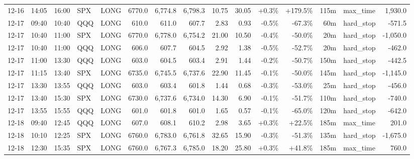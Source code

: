 \documentclass[11pt,a4paper,twoside]{article}
\begin{document}
\begin{landscape}
\begin{center}
\begin{longtable}{>{\color{txtmain}}l l l l l r r r r r r r r >{\color{txtmain}}l r}
12-16 & 14:05 & 16:00 & SPX & LONG & 6770.0 & 6,774.8 & 6,798.3 & 10.75 & 30.05 & \textcolor{wingreen}{+0.3\%} & \textcolor{wingreen}{+179.5\%} & 115m & max\_time & \textcolor{wingreen}{1,930.0} \\
12-17 & 09:40 & 10:40 & QQQ & LONG & 610.0 & 611.0 & 607.7 & 2.83 & 0.93 & \textcolor{lossred}{-0.5\%} & \textcolor{lossred}{-67.3\%} & 60m & hard\_stop & \textcolor{lossred}{-571.5} \\
12-17 & 10:40 & 11:00 & SPX & LONG & 6770.0 & 6,778.0 & 6,754.2 & 21.00 & 10.50 & \textcolor{lossred}{-0.4\%} & \textcolor{lossred}{-50.0\%} & 20m & hard\_stop & \textcolor{lossred}{-1,050.0} \\
12-17 & 10:40 & 11:00 & QQQ & LONG & 606.0 & 607.7 & 604.5 & 2.92 & 1.38 & \textcolor{lossred}{-0.5\%} & \textcolor{lossred}{-52.7\%} & 20m & hard\_stop & \textcolor{lossred}{-462.0} \\
12-17 & 11:00 & 13:30 & QQQ & LONG & 603.0 & 604.5 & 603.4 & 2.91 & 1.44 & \textcolor{lossred}{-0.2\%} & \textcolor{lossred}{-50.7\%} & 150m & hard\_stop & \textcolor{lossred}{-442.5} \\
12-17 & 11:15 & 13:40 & SPX & LONG & 6735.0 & 6,745.5 & 6,737.6 & 22.90 & 11.45 & \textcolor{lossred}{-0.1\%} & \textcolor{lossred}{-50.0\%} & 145m & hard\_stop & \textcolor{lossred}{-1,145.0} \\
12-17 & 13:30 & 13:55 & QQQ & LONG & 603.0 & 603.4 & 601.8 & 1.44 & 0.68 & \textcolor{lossred}{-0.3\%} & \textcolor{lossred}{-53.0\%} & 25m & hard\_stop & \textcolor{lossred}{-456.0} \\
12-17 & 13:40 & 15:30 & SPX & LONG & 6730.0 & 6,737.6 & 6,734.0 & 14.30 & 6.90 & \textcolor{lossred}{-0.1\%} & \textcolor{lossred}{-51.7\%} & 110m & hard\_stop & \textcolor{lossred}{-740.0} \\
12-17 & 13:55 & 15:55 & QQQ & LONG & 601.0 & 601.8 & 601.0 & 1.65 & 0.57 & \textcolor{lossred}{-0.1\%} & \textcolor{lossred}{-65.0\%} & 120m & hard\_stop & \textcolor{lossred}{-642.0} \\
12-18 & 09:40 & 12:45 & QQQ & LONG & 607.0 & 608.1 & 610.2 & 2.98 & 3.65 & \textcolor{wingreen}{+0.3\%} & \textcolor{wingreen}{+22.5\%} & 185m & max\_time & \textcolor{wingreen}{201.0} \\
12-18 & 10:10 & 12:25 & SPX & LONG & 6760.0 & 6,783.0 & 6,761.8 & 32.65 & 15.90 & \textcolor{lossred}{-0.3\%} & \textcolor{lossred}{-51.3\%} & 135m & hard\_stop & \textcolor{lossred}{-1,675.0} \\
12-18 & 12:30 & 15:35 & SPX & LONG & 6760.0 & 6,767.3 & 6,785.0 & 18.20 & 25.80 & \textcolor{wingreen}{+0.3\%} & \textcolor{wingreen}{+41.8\%} & 185m & max\_time & \textcolor{wingreen}{760.0} \\

\end{longtable}
\end{center}
\end{landscape}
\end{document}
